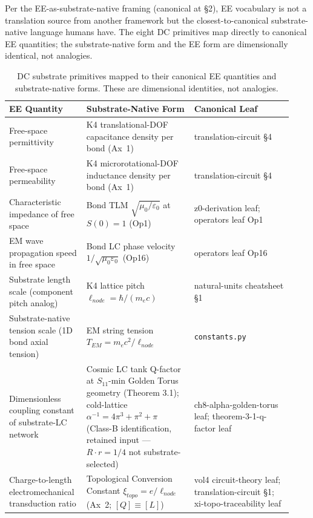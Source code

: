 Per the EE-as-substrate-native framing (canonical at  \S 2), EE vocabulary is not a translation source from another framework but the closest-to-canonical substrate-native language humans have. The eight DC primitives map directly to canonical EE quantities; the substrate-native form and the EE form are dimensionally identical, not analogies.

\begin{table}[htbp]
\centering
\footnotesize
\setlength{\tabcolsep}{4pt}
\begin{tabular}{@{}p{0.24\linewidth} p{0.36\linewidth} p{0.33\linewidth}@{}}
\toprule
\textbf{EE Quantity} & \textbf{Substrate-Native Form} & \textbf{Canonical Leaf} \\
\midrule
Free-space permittivity & K4 translational-DOF capacitance density per bond (Ax~1) & translation-circuit \S 4 \\
Free-space permeability & K4 microrotational-DOF inductance density per bond (Ax~1) & translation-circuit \S 4 \\
Characteristic impedance of free space & Bond TLM $\sqrt{\mu_0/\varepsilon_0}$ at $S(0) = 1$ (Op1) & z0-derivation leaf; operators leaf Op1 \\
EM wave propagation speed in free space & Bond LC phase velocity $1/\sqrt{\mu_0\varepsilon_0}$ (Op16) & operators leaf Op16 \\
Substrate length scale (component pitch analog) & K4 lattice pitch $\ell_{node} = \hbar/(m_e c)$ & natural-units cheatsheet \S 1 \\
Substrate-native tension scale (1D bond axial tension) & EM string tension $T_{EM} = m_e c^2/\ell_{node}$ & \texttt{constants.py} \\
Dimensionless coupling constant of substrate-LC network & Cosmic LC tank Q-factor at $S_{11}$-min Golden Torus geometry (Theorem 3.1); cold-lattice $\alpha^{-1} = 4\pi^3 + \pi^2 + \pi$ (Class-B identification, retained input --- $R\cdot r=1/4$ not substrate-selected) & ch8-alpha-golden-torus leaf; theorem-3-1-q-factor leaf \\
Charge-to-length electromechanical transduction ratio & Topological Conversion Constant $\xi_{topo} = e/\ell_{node}$ (Ax~2; $[Q] \equiv [L]$) & vol4 circuit-theory leaf; translation-circuit \S 1; xi-topo-traceability leaf \\
\bottomrule
\end{tabular}
\caption{DC substrate primitives mapped to their canonical EE quantities and substrate-native forms. These are dimensional identities, not analogies.}
\label{tab:vol9_dc_ee_translation}
\end{table}

